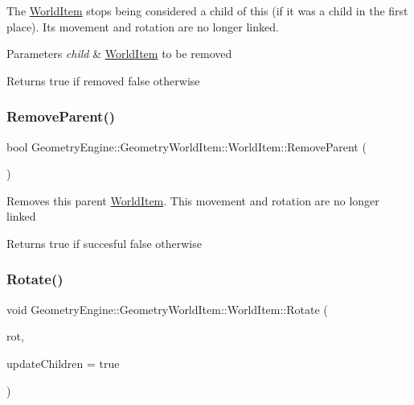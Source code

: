 The \mbox{\hyperlink{class_geometry_engine_1_1_geometry_world_item_1_1_world_item}{World\+Item}} stops being considered a child of this (if it was a child in the first place). Its movement and rotation are no longer linked. 
\begin{DoxyParams}{Parameters}
{\em child} & \mbox{\hyperlink{class_geometry_engine_1_1_geometry_world_item_1_1_world_item}{World\+Item}} to be removed \\
\hline
\end{DoxyParams}
\begin{DoxyReturn}{Returns}
true if removed false otherwise 
\end{DoxyReturn}
\mbox{\label{class_geometry_engine_1_1_geometry_world_item_1_1_world_item_a3e77ca882db0fe70315921af492ebef8}} 
\subsubsection{\texorpdfstring{RemoveParent()}{RemoveParent()}}
{\footnotesize\ttfamily bool Geometry\+Engine\+::\+Geometry\+World\+Item\+::\+World\+Item\+::\+Remove\+Parent (\begin{DoxyParamCaption}{ }\end{DoxyParamCaption})}

Removes this parent \mbox{\hyperlink{class_geometry_engine_1_1_geometry_world_item_1_1_world_item}{World\+Item}}. This movement and rotation are no longer linked \begin{DoxyReturn}{Returns}
true if succesful false otherwise 
\end{DoxyReturn}
\mbox{\label{class_geometry_engine_1_1_geometry_world_item_1_1_world_item_aee1168fdbce65dfac9d75dfe61015036}} 
\subsubsection{\texorpdfstring{Rotate()}{Rotate()}\hspace{0.1cm}{\footnotesize\ttfamily [1/2]}}
{\footnotesize\ttfamily void Geometry\+Engine\+::\+Geometry\+World\+Item\+::\+World\+Item\+::\+Rotate (\begin{DoxyParamCaption}\item[{const Q\+Vector3D \&}]{rot,  }\item[{bool}]{update\+Children = {\ttfamily true} }\end{DoxyParamCaption})}

